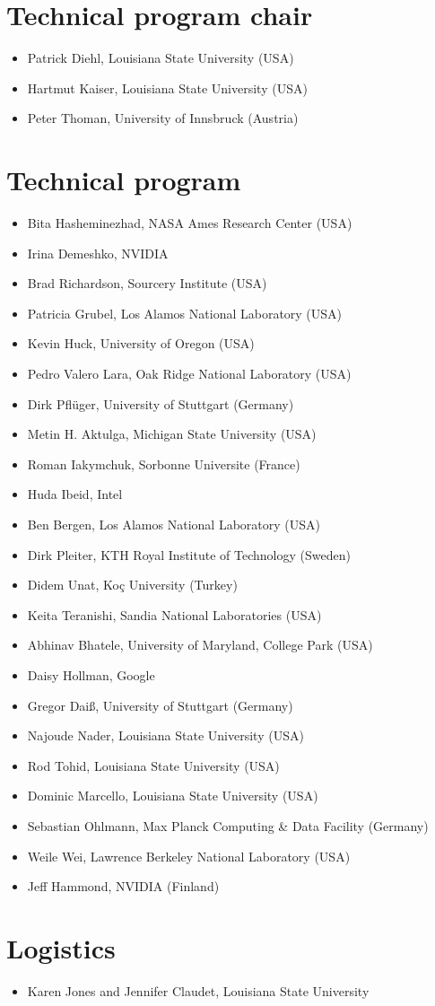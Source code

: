 \section*{Technical program chair}

\begin{itemize}
\item Patrick Diehl, Louisiana State University (USA)
\item Hartmut Kaiser, Louisiana State University (USA)
\item Peter Thoman, University of Innsbruck (Austria)
\end{itemize}

\section*{Technical program }

\begin{itemize}
\item Bita Hasheminezhad, NASA Ames Research Center (USA)
\item Irina Demeshko, NVIDIA
\item Brad Richardson, Sourcery Institute (USA)
\item Patricia Grubel, Los Alamos National Laboratory (USA)
\item Kevin Huck, University of Oregon (USA)
\item Pedro Valero Lara, Oak Ridge National Laboratory (USA)
\item Dirk Pflüger, University of Stuttgart (Germany)
\item Metin H. Aktulga, Michigan State University (USA)
\item Roman Iakymchuk, Sorbonne Universite (France)
\item Huda Ibeid, Intel
\item Ben Bergen, Los Alamos National Laboratory (USA)
\item Dirk Pleiter, KTH Royal Institute of Technology (Sweden)
\item Didem Unat, Koç University (Turkey)
\item Keita Teranishi, Sandia National Laboratories (USA)
\item Abhinav Bhatele, University of Maryland, College Park (USA)
\item Daisy Hollman, Google
\item Gregor Daiß, University of Stuttgart (Germany)
\item Najoude Nader, Louisiana State University (USA)
\item Rod Tohid, Louisiana State University (USA)
\item Dominic Marcello, Louisiana State University (USA)
\item Sebastian Ohlmann, Max Planck Computing \& Data Facility (Germany)
\item Weile Wei, Lawrence Berkeley National Laboratory (USA)
\item Jeff Hammond, NVIDIA (Finland)
\end{itemize}


\section*{Logistics}
\begin{itemize}
\item Karen Jones and Jennifer Claudet, Louisiana State University
\end{itemize}

